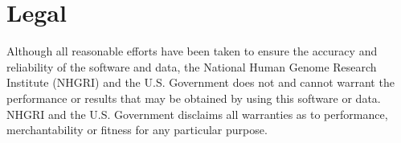 \documentclass[12pt]{article}\usepackage[]{graphicx}\usepackage[]{color}
\begin{document}
\section{Legal} \label{sec:legal}


Although all reasonable efforts have been taken to ensure the
accuracy and reliability of the software and data, the National
Human Genome Research Institute (NHGRI) and the U.S. Government
does not and cannot warrant the performance or results that may
be obtained by using this software or data.  NHGRI and the U.S.
Government disclaims all warranties as to performance,
merchantability or fitness for any particular purpose.
\end{document}

